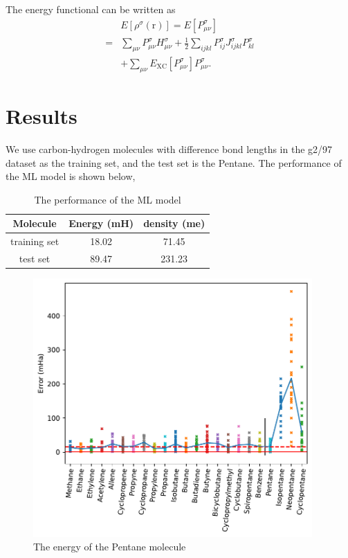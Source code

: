 \documentclass[%
twocolumn,
amsmath,amssymb,
groupedaddress,
reprint,%
]{revtex4-2}
\renewcommand{\>}{\rangle}
\newcommand{\<}{\langle}
\newcommand{\nl}{\nonumber \\}
\newcommand{\XC}{\mathrm{XC}}
\newcommand{\brm}[1]{\bm{\mathrm{#1}}}
\begin{document}
The energy functional can be written as
\begin{align}
      & E[\rho^{{\sigma}}(\brm{r})] = E[P^{\sigma}_{\mu \nu}] \nl
    = & \sum_{\mu \nu} P^{\sigma}_{\mu \nu} H^{\sigma}_{\mu \nu} + \frac{1}{2} \sum_{ijkl} P^{\sigma}_{ij} J^{\sigma}_{ijkl} P^{\sigma}_{kl}  \nl
      & + \sum_{\mu \nu}  E_{\XC}[P^{\sigma}_{\mu \nu}] P^{\sigma}_{\mu \nu}.
\end{align}

\section{Results}
We use carbon-hydrogen molecules with difference bond lengths in the g2/97 dataset as the training set, and the test set is the Pentane.
%
The performance of the ML model is shown below,
\begin{table}[h]
    \centering
    \begin{tabular}{c|c|c}
        \hline
        Molecule     & Energy (mH) & density (me) \\
        \hline
        training set & 18.02       & 71.45        \\
        test set     & 89.47       & 231.23       \\
        \hline
    \end{tabular}
    \caption{The performance of the ML model}
\end{table}

\begin{figure}
    \centering
    \includegraphics[width=0.95\textwidth]{figures/energy.pdf}
    \caption{The energy of the Pentane molecule}
\end{figure}
\end{document}
